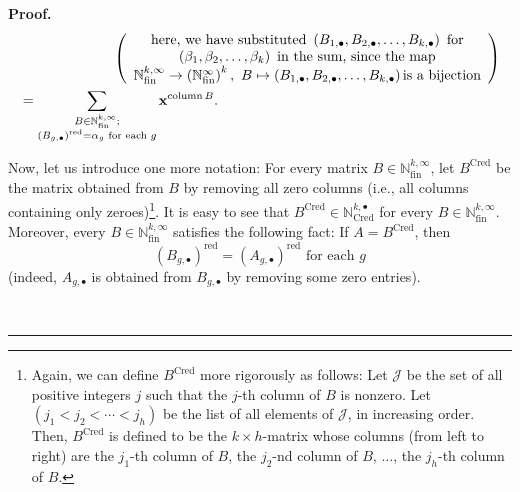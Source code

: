 \documentclass
[numbers=enddot,12pt,final,onecolumn,notitlepage,abstracton]{scrartcl}%
\theoremstyle{definition}
\newenvironment{proof}[1][Proof]{\noindent\textbf{#1.} }{\ \rule{0.5em}{0.5em}}
\let\sumnonlimits\sum
\renewcommand{\sum}{\sumnonlimits\limits}
\begin{document}
\begin{proof}
\begin{align}
&  \ \ \ \ \ \ \ \ \ \ \ \ \ \ \ \ \ \ \ \ \left(
\begin{array}
[c]{c}%
\text{here, we have substituted }\left(  B_{1,\bullet},B_{2,\bullet}%
,\ldots,B_{k,\bullet}\right)  \text{ for}\\
\left(  \beta_{1},\beta_{2},\ldots,\beta_{k}\right)  \text{ in the sum, since
the map}\\
\mathbb{N}_{\operatorname*{fin}}^{k,\infty}\rightarrow\left(  \mathbb{N}%
_{\operatorname*{fin}}^{\infty}\right)  ^{k},\ B\mapsto\left(  B_{1,\bullet
},B_{2,\bullet},\ldots,B_{k,\bullet}\right)  \text{is a bijection}%
\end{array}
\right) \nonumber\\
&  =\sum_{\substack{B\in\mathbb{N}_{\operatorname*{fin}}^{k,\infty};\\\left(
B_{g,\bullet}\right)  ^{\operatorname*{red}}=\alpha_{g}\text{ for each }%
g}}\mathbf{x}^{\operatorname*{column}B}. \label{pf.prop.QSym.M*M*M.2}%
\end{align}


Now, let us introduce one more notation: For every matrix $B\in\mathbb{N}%
_{\operatorname*{fin}}^{k,\infty}$, let $B^{\operatorname*{Cred}}$ be the
matrix obtained from $B$ by removing all zero columns (i.e., all columns
containing only zeroes)\footnote{Again, we can define $B^{\operatorname*{Cred}%
}$ more rigorously as follows: Let $\mathcal{J}$ be the set of all positive
integers $j$ such that the $j$-th column of $B$ is nonzero. Let $\left(
j_{1}<j_{2}<\cdots<j_{h}\right)  $ be the list of all elements of
$\mathcal{J}$, in increasing order. Then, $B^{\operatorname*{Cred}}$ is
defined to be the $k\times h$-matrix whose columns (from left to right) are
the $j_{1}$-th column of $B$, the $j_{2}$-nd column of $B$, $\ldots$, the
$j_{h}$-th column of $B$.}. It is easy to see that $B^{\operatorname*{Cred}%
}\in\mathbb{N}_{\operatorname*{Cred}}^{k,\bullet}$ for every $B\in
\mathbb{N}_{\operatorname*{fin}}^{k,\infty}$. Moreover, every $B\in
\mathbb{N}_{\operatorname*{fin}}^{k,\infty}$ satisfies the following fact: If
$A=B^{\operatorname*{Cred}}$, then
\begin{equation}
\left(  B_{g,\bullet}\right)  ^{\operatorname*{red}}=\left(  A_{g,\bullet
}\right)  ^{\operatorname*{red}}\text{ for each }g
\label{pf.prop.QSym.M*M*M.Cred-props}%
\end{equation}
(indeed, $A_{g,\bullet}$ is obtained from $B_{g,\bullet}$ by removing some
zero entries).


\end{proof}
\end{document}
